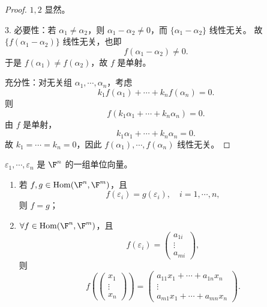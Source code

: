 \begin{proof}
	$1,2$ 显然。
	
	$3.$ 必要性：若 $\alpha_1\neq\alpha_2$，则 $\alpha_1-\alpha_2\neq0$，而 $\{\alpha_1-\alpha_2\}$ 线性无关。
	故 $\{f(\alpha_1-\alpha_2)\}$ 线性无关，也即
	\[
	f(\alpha_1-\alpha_2)\neq0.
	\]
	于是 $f(\alpha_1)\neq f(\alpha_2)$，故 $f$ 是单射。
	
	充分性：对无关组 $\alpha_1,\cdots,\alpha_n$，考虑
	\[
	k_1f(\alpha_1)+\cdots+k_nf(\alpha_n)=0.
	\]
	则
	\[
	f(k_1\alpha_1+
	\cdots+k_n\alpha_n)=0.
	\]
	由 $f$ 是单射，
	\[
	k_1\alpha_1+\cdots+k_n\alpha_n=0.
	\]
	故 $k_1=\cdots=k_n=0$，因此 $f(\alpha_1),\cdots,f(\alpha_n)$ 线性无关。
\end{proof}

\begin{lemma}
	$\varepsilon_1,\cdots,\varepsilon_n$ 是 $\F^n$ 的一组单位向量。
	\begin{enumerate}
		\item 若 $f,g\in\operatorname{Hom}(\F^n,\F^m)$，且
		\[
		f(\varepsilon_i)=g(\varepsilon_i),\quad i=1,\cdots,n,
		\]
		则 $f=g$；
		\item $\forall f\in\operatorname{Hom}(\F^n,\F^m)$，且
		\[
		f(\varepsilon_i)=\begin{pmatrix}a_{1i}\\\vdots\\a_{mi}\end{pmatrix},
		\]
		则
		\[
		f\left(\begin{pmatrix}x_1\\\vdots\\x_n\end{pmatrix}\right)
		=
		\begin{pmatrix}
			a_{11}x_1+\cdots+a_{1n}x_n\\
			\vdots\\
			a_{m1}x_1+
			\cdots+a_{mn}x_n
		\end{pmatrix}.
		\]
	\end{enumerate}
\end{lemma}

